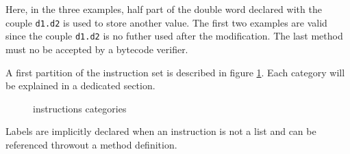\documentclass{article}
\begin{document}
Here, in the three examples, half part of the double word declared with the
couple \verb|d1.d2| is used to store another value. The first two
examples are valid since the couple \verb|d1.d2| is no futher used after
the modification. The last method must no be accepted by a bytecode verifier.


A first partition of the instruction set is described in
figure \ref{catins}. Each category will be explained in a dedicated section.

\begin{figure}\begin{center}
\caption{instructions categories}\label{catins}\end{center}\end{figure}

Labels are implicitly declared when an instruction is not a list and
can be referenced throwout a method definition.
\end{document}
